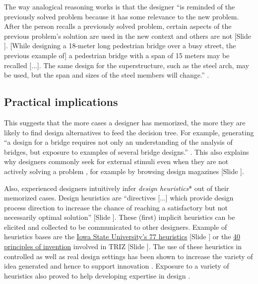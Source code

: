 \documentclass{article}
\newcounter{slide}
\begin{document}
The way analogical reasoning works is that the designer ``is reminded of the previously solved problem because it has some relevance to the new problem. After the person recalls a previously solved problem, certain aspects of the previous problem's solution are used in the new context and others are not {\color{blue}[Slide ]}. [While designing a 18-meter long pedestrian bridge over a busy street, the previous example of] a pedestrian bridge with a span of 15 meters may be recalled [...]. The same design for the superstructure, such as the steel arch, may be used, but the span and sizes of the steel members will change.'' \cite[p. 1-4]{maher2014case}. {\color{red}{heuristics 1) fuel the recombination mechanism of creativity and 2) the decision making mechanism (to open new level in the decision tree and close others}}

\subsection{Practical implications}
\label{sec:Practicalimplicationsone}
This suggests that the more cases a designer has memorized, the more they are likely to find design alternatives to feed the decision tree. For example, generating ``a design for a bridge requires not only an understanding of the analysis of bridges, but exposure to examples of several bridge designs.'' \cite[p. 1]{maher2014case}. This also explains why designers commonly seek for external stimuli even when they are not actively solving a problem \cite{goncalvesInspirationChoicesThat2016}, for example by browsing design magazines {\color{blue}[Slide ]}.

Also, experienced designers intuitively infer \emph{design heuristics}* out of their memorized cases. Design heuristics are ``directives [...] which provide design process direction to increase the chance of reaching a satisfactory but not necessarily optimal solution'' \cite{fuDesignPrinciplesLiterature2016} {\color{blue}[Slide ]}. These (first) implicit heuristics can be elicited and collected to be communicated to other designers. Example of heuristics bases are the \href{https://www.design.iastate.edu/news/2016/08/design-heuristics/}{Iowa State University's 77 heuristics} {\color{blue}[Slide ]} or the \href{https://en.wikipedia.org/wiki/40_principles_of_invention}{40 principles of invention} involved in TRIZ {\color{blue}[Slide ]}. The use of these heuristics in controlled as well as real design settings has been shown to increase the variety of idea generated and hence to support innovation \cite{yilmazCanExperiencedDesigners2013}. Exposure to a variety of heuristics also proved to help developing expertise in design \cite{yilmazHowDesignersGenerate2015}. 
\end{document}
